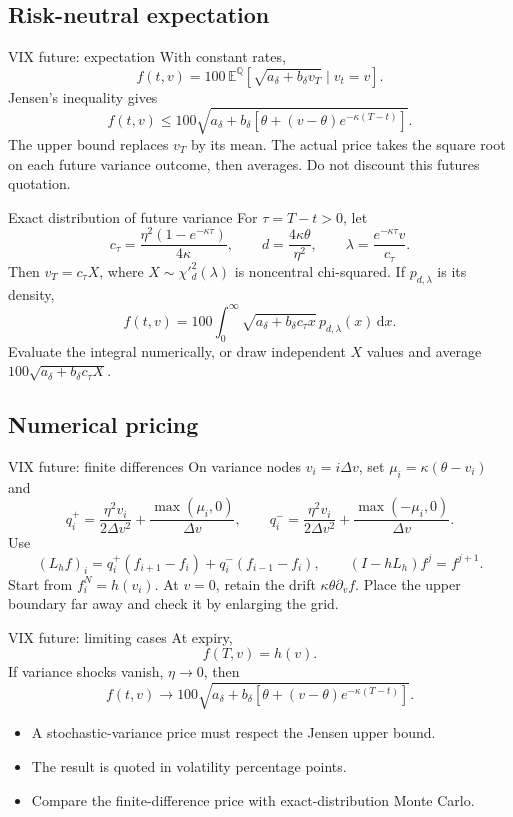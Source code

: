 \documentclass[handout,10pt,t,aspectratio=169]{beamer}
\newcommand{\E}{\mathbb E}
\newcommand{\Q}{\mathbb Q}
\newcommand{\dd}{\,\mathrm d}
\begin{document}
\subsection{Risk-neutral expectation}

\begin{frame}{VIX future: expectation}
\small
With constant rates,
\[
 \boxed{f(t,v)=100\,\E^\Q[\sqrt{a_\delta+b_\delta v_T}\mid v_t=v].}
\]
Jensen's inequality gives
\[
 f(t,v)\leq100\sqrt{a_\delta+b_\delta
 [\theta+(v-\theta)e^{-\kappa(T-t)}]}.
\]
The upper bound replaces \(v_T\) by its mean.
The actual price takes the square root on each future variance outcome,
then averages. Do not discount this futures quotation.
\end{frame}

\begin{frame}{Exact distribution of future variance}
\small
For \(\tau=T-t>0\), let
\[
 c_\tau=\frac{\eta^2(1-e^{-\kappa\tau})}{4\kappa},\qquad
 d=\frac{4\kappa\theta}{\eta^2},\qquad
 \lambda=\frac{e^{-\kappa\tau}v}{c_\tau}.
\]
Then \(v_T=c_\tau X\), where \(X\sim\chi'^2_d(\lambda)\) is
noncentral chi-squared. If \(p_{d,\lambda}\) is its density,
\[
 f(t,v)=100\int_0^\infty\sqrt{a_\delta+b_\delta c_\tau x}\,
 p_{d,\lambda}(x)\dd x.
\]
Evaluate the integral numerically, or draw independent \(X\) values and
average \(100\sqrt{a_\delta+b_\delta c_\tau X}\).
\end{frame}

\subsection{Numerical pricing}

\begin{frame}{VIX future: finite differences}
\small
On variance nodes \(v_i=i\Delta v\), set \(\mu_i=\kappa(\theta-v_i)\) and
\[
 q_i^+=\frac{\eta^2v_i}{2\Delta v^2}+\frac{\max(\mu_i,0)}{\Delta v},\qquad
 q_i^-=\frac{\eta^2v_i}{2\Delta v^2}+\frac{\max(-\mu_i,0)}{\Delta v}.
\]
Use
\[
 (L_hf)_i=q_i^+(f_{i+1}-f_i)+q_i^-(f_{i-1}-f_i),
 \qquad (I-hL_h)f^j=f^{j+1}.
\]
Start from \(f_i^N=h(v_i)\). At \(v=0\), retain the drift
\(\kappa\theta\partial_v f\). Place the upper boundary far away and check it
by enlarging the grid.
\end{frame}


\begin{frame}{VIX future: limiting cases}
\small
At expiry,
\[
 f(T,v)=h(v).
\]
If variance shocks vanish, \(\eta\to0\), then
\[
 f(t,v)\to100\sqrt{a_\delta+b_\delta
 [\theta+(v-\theta)e^{-\kappa(T-t)}]}.
\]
\begin{itemize}
\item A stochastic-variance price must respect the Jensen upper bound.
\item The result is quoted in volatility percentage points.
\item Compare the finite-difference price with exact-distribution Monte Carlo.
\end{itemize}
\end{frame}
\end{document}
